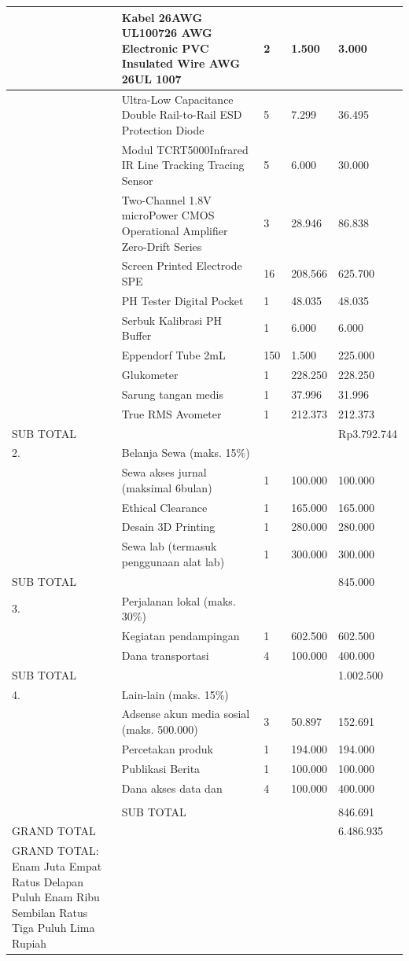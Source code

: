 \documentclass[a4paper,12pt]{article}
\begin{document}
\begin{longtable}{|p{}|p{}|p{}|p{}|p{}|}
\hline
 & Kabel 26AWG UL100726 AWG Electronic PVC Insulated Wire AWG 26UL 1007 & 2 & 1.500 & 3.000 \\
\hline
 & Ultra-Low Capacitance Double Rail-to-Rail ESD Protection Diode & 5 & 7.299 & 36.495 \\
\hline
 & Modul TCRT5000Infrared IR Line Tracking Tracing Sensor & 5 & 6.000 & 30.000 \\
\hline
 & Two-Channel 1.8V microPower CMOS Operational Amplifier Zero-Drift Series & 3 & 28.946 & 86.838 \\
\hline
 & Screen Printed Electrode SPE & 16 & 208.566 & 625.700 \\
\hline
 & PH Tester Digital Pocket & 1 & 48.035 & 48.035 \\
\hline
 & Serbuk Kalibrasi PH Buffer & 1 & 6.000 & 6.000 \\
\hline
 & Eppendorf Tube 2mL & 150 & 1.500 & 225.000 \\
\hline
 & Glukometer & 1 & 228.250 & 228.250 \\
\hline
 & Sarung tangan medis & 1 & 37.996 & 31.996 \\
\hline
 & True RMS Avometer & 1 & 212.373 & 212.373 \\
\hline
SUB TOTAL &  &  &  & Rp3.792.744 \\
\hline
2. & Belanja Sewa (maks. 15\%) &  &  &  \\
\hline
 & Sewa akses jurnal (maksimal 6bulan) & 1 & 100.000 & 100.000 \\
\hline
 & Ethical Clearance & 1 & 165.000 & 165.000 \\
\hline
 & Desain 3D Printing & 1 & 280.000 & 280.000 \\
\hline
 & Sewa lab (termasuk penggunaan alat lab) & 1 & 300.000 & 300.000 \\
\hline
SUB TOTAL &  &  &  & 845.000 \\
\hline
3. & Perjalanan lokal (maks. 30\%) &  &  &  \\
\hline
 & Kegiatan pendampingan & 1 & 602.500 & 602.500 \\
\hline
 & Dana transportasi & 4 & 100.000 & 400.000 \\
\hline
SUB TOTAL &  &  &  & 1.002.500 \\
\hline
4. & Lain-lain (maks. 15\%) &  &  &  \\
\hline
 & Adsense akun media sosial (maks. 500.000) & 3 & 50.897 & 152.691 \\
\hline
 & Percetakan produk & 1 & 194.000 & 194.000 \\
\hline
 & Publikasi Berita & 1 & 100.000 & 100.000 \\
\hline
 & Dana akses data dan & 4 & 100.000 & 400.000 \\
\hline
 &  &  &  &  \\
\hline
 & SUB TOTAL &  &  & 846.691 \\
\hline
GRAND TOTAL &  &  &  & 6.486.935 \\
\hline
GRAND TOTAL: Enam Juta Empat Ratus Delapan Puluh Enam Ribu Sembilan Ratus Tiga Puluh Lima Rupiah &  &  &  &  \\
\hline
\end{longtable}
\end{document}
